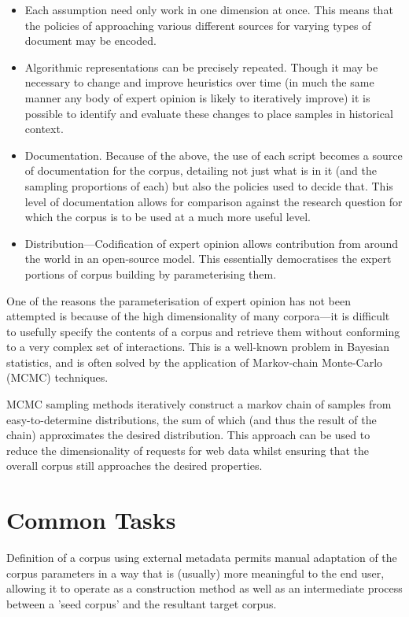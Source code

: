 \begin{itemize}
    \item Each assumption need only work in one dimension at once.  This means that the policies of approaching various different sources for varying types of document may be encoded.
    \item Algorithmic representations can be precisely repeated.  Though it may be necessary to change and improve heuristics over time (in much the same manner any body of expert opinion is likely to iteratively improve) it is possible to identify and evaluate these changes to place samples in historical context.
    \item Documentation.  Because of the above, the use of each script becomes a source of documentation for the corpus, detailing not just what is in it (and the sampling proportions of each) but also the policies used to decide that.  This level of documentation allows for comparison against the research question for which the corpus is to be used at a much more useful level.
    \item Distribution---Codification of expert opinion allows contribution from around the world in an open-source model.  This essentially democratises the expert portions of corpus building by parameterising them.
\end{itemize}


One of the reasons the parameterisation of expert opinion has not been attempted is because of the high dimensionality of many corpora---it is difficult to usefully specify the contents of a corpus and retrieve them without conforming to a very complex set of interactions.  This is a well-known problem in Bayesian statistics, and is often solved by the application of Markov-chain Monte-Carlo (MCMC) techniques.

MCMC sampling methods iteratively construct a markov chain of samples from easy-to-determine distributions, the sum of which (and thus the result of the chain) approximates the desired distribution.  This approach can be used to reduce the dimensionality of requests for web data whilst ensuring that the overall corpus still approaches the desired properties.
     


\section{Common Tasks}
Definition of a corpus using external metadata permits manual adaptation of the corpus parameters in a way that is (usually) more meaningful to the end user, allowing it to operate as a construction method as well as an intermediate process between a 'seed corpus' and the resultant target corpus.


